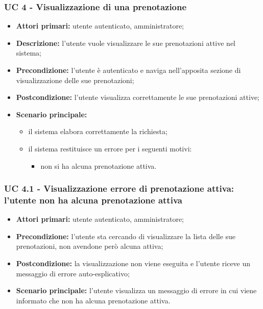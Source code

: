 \subsubsection{UC 4 - Visualizzazione di una prenotazione}

\begin{itemize}
\item \textbf{Attori primari:} utente autenticato, amministratore;
\item \textbf{Descrizione:} l’utente vuole visualizzare le sue prenotazioni attive nel sistema;
\item \textbf{Precondizione:} l’utente è autenticato e naviga nell’apposita sezione di visualizzazione delle sue prenotazioni;
\item \textbf{Postcondizione:} l’utente visualizza correttamente le sue prenotazioni attive;
\item \textbf{Scenario principale:} 
	\begin{itemize}
		\item il sistema elabora correttamente la richiesta;
		\item il sistema restituisce un errore per i seguenti motivi:
		\begin{itemize}
			\item non si ha alcuna prenotazione attiva.
		\end{itemize}
	\end{itemize}
\end{itemize}

\subsubsection{UC 4.1 - Visualizzazione errore di prenotazione attiva: l'utente non ha alcuna prenotazione attiva}
\begin{itemize}
\item \textbf{Attori primari:} utente autenticato, amministratore;
\item \textbf{Precondizione:} l'utente sta cercando di visualizzare la lista delle sue prenotazioni, non avendone però alcuna attiva;
\item \textbf{Postcondizione:} la visualizzazione non viene eseguita e l'utente riceve un messaggio di errore auto-esplicativo;
\item \textbf{Scenario principale:} l'utente visualizza un messaggio di errore in cui viene informato che non ha alcuna prenotazione attiva.
\end{itemize}

